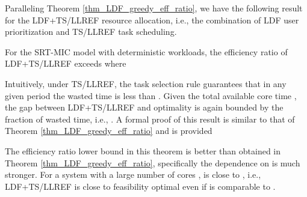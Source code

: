 \documentclass[prodmode,acmtompecs]{acmsmall}
\newcommand{\myComments}[1]{}
\newif\ifinfocom
\newif\iftompecs
\newif\ifdissertation
\newcommand{\infocomStart}{\ifinfocom \myComments{Infocom: }}
\newcommand{\tompecsStart}{\iftompecs \myComments{TOMPECS version: }}
\newcommand{\dissertationStart}{\ifdissertation  \myComments{Dissertation version: }}
\newcommand{\commentEnd}{\myComments{End}}
\begin{document}
Paralleling Theorem \ref{thm_LDF_greedy_eff_ratio}, we have the following result for the LDF+TS/LLREF resource allocation, i.e., the combination of LDF user prioritization and TS/LLREF task scheduling. 
\dissertationStart
The framework of LDF+TS/LLREF is exhibited in Figure{~\ref{fig_LDF_TS_LLREF_framework}}. 
\commentEnd\fi

\begin{theorem}
\label{thm_LDF_TS_LLREF_eff_ratio}
For the SRT-MIC model with deterministic workloads, the efficiency ratio of LDF+TS/LLREF exceeds  where

\end{theorem}

Intuitively, under TS/LLREF, the task selection rule guarantees that in any given period the wasted time  is less than . Given the total available core time , the gap between LDF+TS/LLREF and optimality is again bounded by the fraction of wasted time, i.e.,  . A formal proof of this result is similar to that of Theorem \ref{thm_LDF_greedy_eff_ratio} and is provided 
\infocomStart
in the extended version of this paper \cite{EXT}. 
\commentEnd\fi
\tompecsStart
in Appendix \ref{appendix_pf_thm_LDF_TS_LLREF_eff_ratio}. 
\commentEnd\fi

The efficiency ratio lower bound  in this theorem is better than  obtained in Theorem \ref{thm_LDF_greedy_eff_ratio}, specifically the dependence on  is much stronger. For a system with a large number of cores ,  is close to , i.e., LDF+TS/LLREF is close to feasibility optimal even if  is comparable to . 

\dissertationStart
Under the more general NBUE (but not deterministic) workload assumption, if we somehow know the workload realizations at the beginning of each period, 
we can still adopt the LDF+TS/LLREF policy where the task selection is based on workload realizations. By similar proof as that for Theorem \ref{thm_LDF_TS_LLREF_eff_ratio} we can get the following corollary:
\begin{corollary}
For the SRT-MIC model with random NBUE workloads, if a QoS requirement vector  can be fulfilled by some non-clairvoyant design, then under LDF+TS/LLREF which is clairvoyant , where

\end{corollary}

In this corollary we are only comparing with non-clairvoyant designs, but note that in this scenario the LDF+TS/LLREF is a clairvoyant design because it requires knowledge of workload realizations, which can be hard in practice. 
\commentEnd\fi
\end{document}
